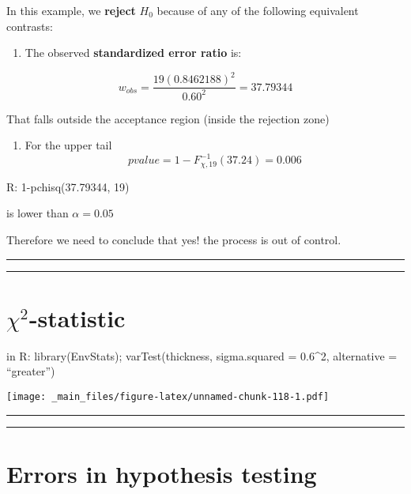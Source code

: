 \documentclass[
]{book}
\providecommand{\tightlist}{%
  \setlength{\itemsep}{0pt}\setlength{\parskip}{0pt}}
\begin{document}
In this example, we \textbf{reject} \(H_0\) because of any of the following equivalent contrasts:

\begin{enumerate}
\def\labelenumi{\arabic{enumi}.}
\tightlist
\item
  The observed \textbf{standardized error ratio} is:
\end{enumerate}

\[w_{obs}=\frac{19 (0.8462188)^2}{0.60^2}=37.79344\]

That falls outside the acceptance region (inside the rejection zone)

\begin{enumerate}
\def\labelenumi{\arabic{enumi}.}
\setcounter{enumi}{1}
\tightlist
\item
  For the upper tail \[pvalue=1-F_{\chi,19}^{-1}(37.24)= 0.006\]
\end{enumerate}

R: 1-pchisq(37.79344, 19)

is lower than \(\alpha=0.05\)

Therefore we need to conclude that yes! the process is out of control.

\begin{center}\rule{0.5\linewidth}{0.5pt}\end{center}

\begin{center}\rule{0.5\linewidth}{0.5pt}\end{center}

\hypertarget{chi2-statistic-3}{%
\section{\texorpdfstring{\(\chi^2\)-statistic}{\textbackslash chi\^{}2-statistic}}\label{chi2-statistic-3}}

in R: library(EnvStats);
varTest(thickness, sigma.squared = 0.6\^{}2, alternative = ``greater'')

\texttt{[image: \_main\_files/figure-latex/unnamed-chunk-118-1.pdf]}

\begin{center}\rule{0.5\linewidth}{0.5pt}\end{center}

\begin{center}\rule{0.5\linewidth}{0.5pt}\end{center}

\hypertarget{errors-in-hypothesis-testing}{%
\section{Errors in hypothesis testing}\label{errors-in-hypothesis-testing}}
\end{document}
